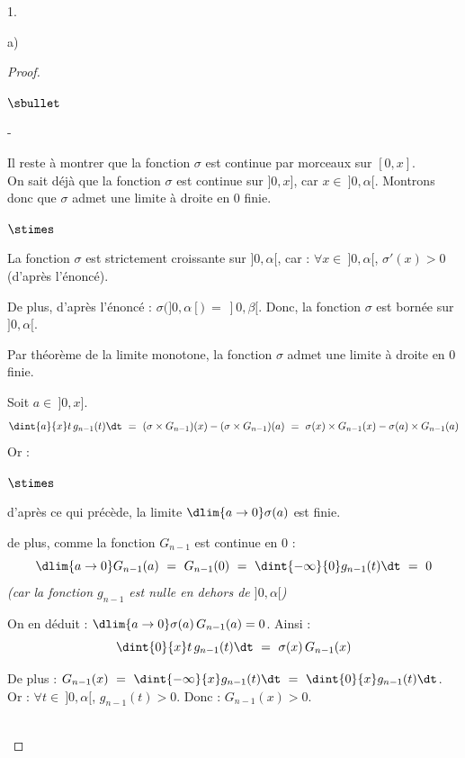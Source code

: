 \documentclass[11pt]{article}%
\begin{document}
\begin{noliste}{1.}
\begin{noliste}{a)}
\begin{proof}
\begin{noliste}{$\sbullet$}
\begin{noliste}{-}
	  \item Il reste à montrer que la fonction $\sigma$ est 
	  continue par morceaux sur $[0,x]$.\\
	  On sait déjà que la fonction $\sigma$ est continue sur 
	  $]0,x]$, car $x \in \ ]0,\alpha[$. Montrons donc que $\sigma$
	  admet une limite à droite en $0$ finie.
	\end{noliste}
	\begin{liste}{$\stimes$}
	  \item La fonction $\sigma$ est strictement croissante sur 
	  $]0,\alpha[$, car : $\forall x \in \ ]0,\alpha[$, 
	  $\sigma'(x) >0$ (d'après l'énoncé).
	  
	  \item De plus, d'après l'énoncé : $\sigma(]0,\alpha[) \ = \
	  ]0, \beta[$. Donc, la fonction $\sigma$ est bornée sur 
	  $]0,\alpha[$.
	\end{liste}
	\begin{noliste}{}
	  \item Par théorème de la limite monotone, la fonction 
	  $\sigma$ admet une limite à droite en $0$ finie.
	\end{noliste}
	
	
	
	
	
	
	Soit $a \in \ ]0,x]$.
	\[
	  \dint{a}{x} t \, g_{n-1}(t) \dt \ = \ (\sigma \times G_{n-1})
	  (x) - (\sigma \times G_{n-1})(a)
	  \ = \ \sigma(x) \times G_{n-1}(x) - \sigma(a) \times 
	  G_{n-1}(a)
	\]
	Or :
	\begin{noliste}{$\stimes$}
	  \item d'après ce qui précède, la limite $\dlim{a\to 0} 
	  \sigma(a)$ est finie.
	  \item de plus, comme la fonction $G_{n-1}$ est continue 
	  en $0$ : 
	  \[
	    \dlim{a \to 0} G_{n-1}(a) \ = \
	    G_{n-1}(0) \ = \ \dint{-\infty}{0} g_{n-1}(t)
	    \dt \ = \ 0 
	  \]
	  {\it (car la fonction $g_{n-1}$ est nulle en dehors 
	  de $]0,\alpha[$)}
	\end{noliste}
	On en déduit : $\dlim{a\to 0} \sigma(a) \, G_{n-1}(a)=0$. Ainsi 
	:
	\[
	  \dint{0}{x} t \, g_{n-1}(t) \dt \ = \ \sigma(x) \, G_{n-1}(x)
	\]

	
	\item De plus : $G_{n-1}(x) \ = \ \dint{-\infty}{x} g_{n-1}(t)
	\dt \ = \ \dint{0}{x} g_{n-1}(t) \dt$.\\[.1cm]
	Or : $\forall t \in \ ]0, \alpha[$, $g_{n-1}(t) >0$. Donc :
	$G_{n-1}(x) >0$.
      \end{noliste}
      \conc{D'où : $\forall x \in \ ]0,\alpha[$, $\sigma(x) = 
      \dfrac{1}{G_{n-1}(x)} \, \dint{0}{x} t \, g_{n-1}(t) 
      \dt$.}~\\[-1cm]
    \end{proof}
    

\end{noliste}
\end{noliste}
\end{document}
